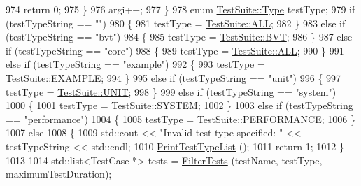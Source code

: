 \begin{DoxyCode}
974           \textcolor{keywordflow}{return} 0;
975         \}
976       argi++;
977     \}
978   \textcolor{keyword}{enum} \hyperlink{classns3_1_1TestSuite_a1ebfcab34ec8161e085e8e3a1855eae0}{TestSuite::Type} testType;
979   \textcolor{keywordflow}{if} (testTypeString == \textcolor{stringliteral}{""})
980     \{
981       testType = \hyperlink{classns3_1_1TestSuite_a1ebfcab34ec8161e085e8e3a1855eae0ad8b114e201710e2d7d6b9d39564f585a}{TestSuite::ALL};
982     \}
983   \textcolor{keywordflow}{else} \textcolor{keywordflow}{if} (testTypeString == \textcolor{stringliteral}{"bvt"})
984     \{
985       testType = \hyperlink{classns3_1_1TestSuite_a1ebfcab34ec8161e085e8e3a1855eae0a63b3cc3850b48eba5909e975232a4efc}{TestSuite::BVT};
986     \}
987   \textcolor{keywordflow}{else} \textcolor{keywordflow}{if} (testTypeString == \textcolor{stringliteral}{"core"})
988     \{
989       testType = \hyperlink{classns3_1_1TestSuite_a1ebfcab34ec8161e085e8e3a1855eae0ad8b114e201710e2d7d6b9d39564f585a}{TestSuite::ALL};
990     \}
991   \textcolor{keywordflow}{else} \textcolor{keywordflow}{if} (testTypeString == \textcolor{stringliteral}{"example"})
992     \{
993       testType = \hyperlink{classns3_1_1TestSuite_a1ebfcab34ec8161e085e8e3a1855eae0a00fd09245de411aef0a7a4e42b858df2}{TestSuite::EXAMPLE};
994     \}
995   \textcolor{keywordflow}{else} \textcolor{keywordflow}{if} (testTypeString == \textcolor{stringliteral}{"unit"})
996     \{
997       testType = \hyperlink{classns3_1_1TestSuite_a1ebfcab34ec8161e085e8e3a1855eae0a3885375a3787abf60431f8454b3cadbd}{TestSuite::UNIT};
998     \}
999   \textcolor{keywordflow}{else} \textcolor{keywordflow}{if} (testTypeString == \textcolor{stringliteral}{"system"})
1000     \{
1001       testType = \hyperlink{classns3_1_1TestSuite_a1ebfcab34ec8161e085e8e3a1855eae0a90c5529a26ab3a5ffcc6e57040dbd82e}{TestSuite::SYSTEM};
1002     \}
1003   \textcolor{keywordflow}{else} \textcolor{keywordflow}{if} (testTypeString == \textcolor{stringliteral}{"performance"})
1004     \{
1005       testType = \hyperlink{classns3_1_1TestSuite_a1ebfcab34ec8161e085e8e3a1855eae0a0d439cead7625e5ab851a783a72ada84}{TestSuite::PERFORMANCE};
1006     \}
1007   \textcolor{keywordflow}{else}
1008     \{
1009       std::cout << \textcolor{stringliteral}{"Invalid test type specified: "} << testTypeString << std::endl;
1010       \hyperlink{classns3_1_1TestRunnerImpl_a187a7decf379b368fb8c7453671f9f32}{PrintTestTypeList} ();
1011       \textcolor{keywordflow}{return} 1;
1012     \}
1013 
1014   std::list<TestCase *> tests = \hyperlink{classns3_1_1TestRunnerImpl_a42560fb0ddfece59837a10913426a87b}{FilterTests} (testName, testType, maximumTestDuration);

\end{DoxyCode}
